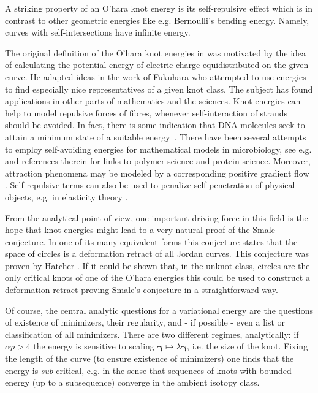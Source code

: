 \documentclass[a4paper,10pt,intlimits,ngerman]{amsart}
\numberwithin{equation}{section}
\newcommand{\sol}{{\boldsymbol{\gamma}}}
\begin{document}
A striking property of an O'hara knot energy is its self-repulsive effect which is in contrast to other geometric energies like e.g. Bernoulli's bending energy. Namely, curves with self-intersections have infinite energy. 

The original definition of the O'hara knot energies in \cite{OH91,OH92} was motivated by the idea of calculating the potential energy of electric charge equidistributed on the given curve. He adapted ideas in the work of Fukuhara \cite{Fukuhara1988} who attempted to use energies to find especially nice representatives of a given knot class.  The subject has found applications in other parts of mathematics and the sciences. Knot energies can help to model repulsive forces of fibres, whenever self-interaction of strands should be avoided. In fact, there is some indication that DNA molecules seek to attain a minimum state of a suitable energy~\cite{Moffatt1996}. There have been several attempts to employ self-avoiding energies for mathematical models in microbiology, see e.g. \cite{Banavar2003}  and references therein for links to polymer science and protein science. Moreover, attraction phenomena may be modeled by a corresponding positive gradient flow \cite{Reiter2009}. Self-repulsive terms can also be used to penalize self-penetration of physical objects, e.g. in elasticity theory \cite{K18}.

From the analytical point of view, one important driving force in this field is the hope that knot energies might lead to a very natural proof of the Smale conjecture. In one of its many equivalent forms this conjecture states that the space of circles is a deformation retract of all Jordan curves. This conjecture was proven by Hatcher \cite{Hatcher1983}. If it could be shown that, in the unknot class, circles are the only critical knots of one of the O'hara energies this could be used to construct a deformation retract proving Smale's conjecture in a straightforward way.

Of course, the central analytic questions for a variational energy are the questions of existence of minimizers, their regularity, and - if possible - even a list or classification of all minimizers. There are two different regimes, analytically: if $\alpha p > 4$ the energy is sensitive to scaling $\sol \mapsto \lambda \sol$, i.e. the size of the knot. Fixing the length of the curve (to ensure existence of minimizers) one finds that the energy is \emph{sub}-critical, e.g. in the sense that sequences of knots with bounded energy (up to a subsequence) converge in the ambient isotopy class. 
\end{document}
